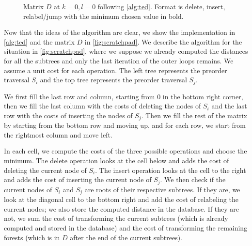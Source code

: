 \begin{figure}[ht]
\caption{Matrix $D$ at $k=0, l=0$ following \autoref{alg:ted}. Format is delete, insert, relabel/jump with the minimum chosen value in bold.}
\label{fig:scratchpad}
\end{figure}

Now that the ideas of the algorithm are clear, we show the implementation in \autoref{alg:ted} and the matrix $D$ in \autoref{fig:scratchpad}.
We describe the algorithm for the situation in \autoref{fig:scratchpad}, where we suppose we already computed the distances for all the subtrees and only the last iteration of the outer loops remains.
We assume a unit cost for each operation.
The left tree represents the preorder traversal $S_i$ and the top tree represents the preorder traversal $S_j$.

We first fill the last row and column, starting from $0$ in the bottom right corner, then we fill the last column with the costs of deleting the nodes of $S_i$ and the last row with the costs of inserting the nodes of $S_j$.
Then we fill the rest of the matrix by starting from the bottom row and moving up, and for each row, we start from the rightmost column and move left.

In each cell, we compute the costs of the three possible operations and choose the minimum.
The delete operation looks at the cell below and adds the cost of deleting the current node of $S_i$.
The insert operation looks at the cell to the right and adds the cost of inserting the current node of $S_j$.
We then check if the current nodes of $S_i$ and $S_j$ are roots of their respective subtrees.
If they are, we look at the diagonal cell to the bottom right and add the cost of relabeling the current nodes; we also store the computed distance in the database.
If they are not, we sum the cost of transforming the current subtrees (which is already computed and stored in the database) and the cost of transforming the remaining forests (which is in $D$ after the end of the current subtrees).

